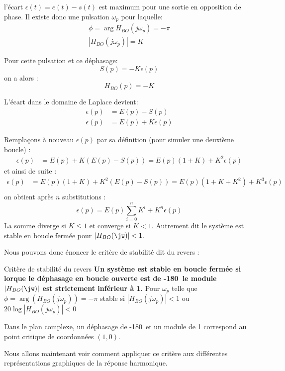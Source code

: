 l'écart $\epsilon(t)=e(t)-s(t)$ est maximum pour une sortie en opposition de phase.
Il existe donc une pulsation $\omega_p$ pour laquelle:
\begin{align*}
    \phi=\arg{H_{BO}(j\omega_p)}=-\pi\\
    |H_{BO}(j\omega_p)|=K    
\end{align*}

Pour cette pulsation et ce déphasage: 
$$
S(p)=-K\epsilon(p)
$$
on a alors :
$$
H_{BO}(p)=-K
$$

L'écart dans le domaine de Laplace devient:
\begin{align*}
    \epsilon(p)&=E(p)-S(p)\\
    \epsilon(p)&=E(p)+K\epsilon(p)
\end{align*}

Remplaçons à nouveau $\epsilon(p)$ par sa définition (pour simuler une deuxième boucle) : 
\begin{align*}
    \epsilon(p)&=E(p)+K(E(p)-S(p))=E(p)(1+K)+K^2\epsilon(p)
\end{align*}
et ainsi de suite :
\begin{align*}
    \epsilon(p)&=E(p)(1+K)+K^2\left(E(p)-S(p)\right)=E(p)(1+K+K^2)+K^3\epsilon(p)\\
\end{align*}
on obtient après $n$ substitutions :
$$
\epsilon(p)=E(p)\sum_{i=0}^{n}K^i+K^n\epsilon(p)
$$
La somme diverge si $K\leq1$ et converge si $K<1$. Autrement dit le système est stable 
en boucle fermée pour $|H_{BO}(\jw)|<1$.

Nous pouvons donc énoncer le critère de stabilité dit du revers :

\begin{criteria}{Critère de stabilité du revers}
    \textbf{Un système est stable en boucle fermée si lorque le déphasage en boucle 
    ouverte est de -180\degree~le module $|H_{BO}(\jw)|$ est strictement inférieur à 1.}
    Pour $\omega_p$ telle que $\phi=\arg{\left(H_{BO}(j\omega_p)\right)}=-\pi$ stable 
    si  $|H_{BO}(j\omega_p)|<1$ ou $20\log{|H_{BO}(j\omega_p)|}<0$ 
\end{criteria}

Dans le plan complexe, un  déphasage de -180\degree~et un module de 1 
correspond au point critique de coordonnées $(1,0)$.

Nous allons maintenant voir comment appliquer ce critère aux différentes représentations graphiques
de la réponse harmonique.

\newpage
